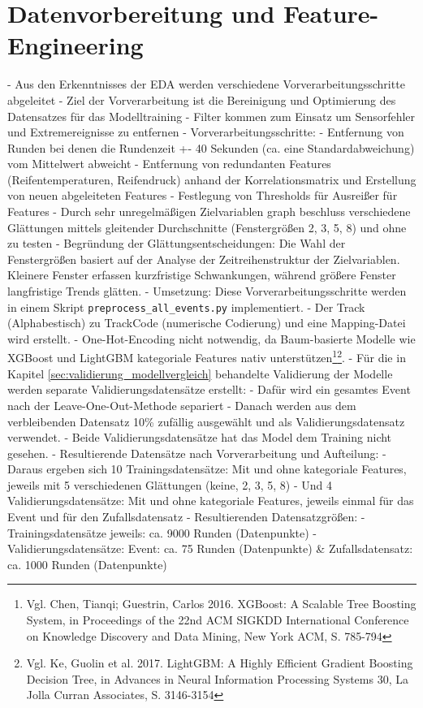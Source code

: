 \section{Datenvorbereitung und Feature-Engineering}

- Aus den Erkenntnisses der EDA werden verschiedene Vorverarbeitungsschritte abgeleitet
- Ziel der Vorverarbeitung ist die Bereinigung und Optimierung des Datensatzes für das Modelltraining
- Filter kommen zum Einsatz um Sensorfehler und Extremereignisse zu entfernen
- Vorverarbeitungsschritte:
- Entfernung von Runden bei denen die Rundenzeit +- 40 Sekunden (ca. eine Standardabweichung) vom Mittelwert abweicht
- Entfernung von redundanten Features (Reifentemperaturen, Reifendruck) anhand der Korrelationsmatrix und Erstellung von neuen abgeleiteten Features
- Festlegung von Thresholds für Ausreißer für Features
- Durch sehr unregelmäßigen Zielvariablen graph beschluss verschiedene Glättungen mittels gleitender Durchschnitte (Fenstergrößen 2, 3, 5, 8) und ohne zu testen
- Begründung der Glättungsentscheidungen: Die Wahl der Fenstergrößen basiert auf der Analyse der Zeitreihenstruktur der Zielvariablen. Kleinere Fenster erfassen kurzfristige Schwankungen, während größere Fenster langfristige Trends glätten.
- Umsetzung: Diese Vorverarbeitungsschritte werden in einem Skript \texttt{preprocess\_all\_events.py} implementiert.
- Der Track (Alphabestisch) zu TrackCode (numerische Codierung) und eine Mapping-Datei wird erstellt.
- One-Hot-Encoding nicht notwendig, da Baum-basierte Modelle wie XGBoost und LightGBM kategoriale Features nativ unterstützen\footnote{Vgl. Chen, Tianqi; Guestrin, Carlos 2016. XGBoost: A Scalable Tree Boosting System, in Proceedings of the 22nd ACM SIGKDD International Conference on Knowledge Discovery and Data Mining, New York ACM, S. 785-794}\footnote{Vgl. Ke, Guolin et al. 2017. LightGBM: A Highly Efficient Gradient Boosting Decision Tree, in Advances in Neural Information Processing Systems 30, La Jolla Curran Associates, S. 3146-3154}.
- Für die in Kapitel \ref{sec:validierung_modellvergleich} behandelte Validierung der Modelle werden separate Validierungsdatensätze erstellt:
- Dafür wird ein gesamtes Event nach der Leave-One-Out-Methode separiert
- Danach werden aus dem verbleibenden Datensatz 10\% zufällig ausgewählt und als Validierungsdatensatz verwendet.
- Beide Validierungsdatensätze hat das Model dem Training nicht gesehen.
- Resultierende Datensätze nach Vorverarbeitung und Aufteilung: 
- Daraus ergeben sich 10 Trainingsdatensätze: Mit und ohne kategoriale Features, jeweils mit 5 verschiedenen Glättungen (keine, 2, 3, 5, 8)
- Und 4 Validierungsdatensätze: Mit und ohne kategoriale Features, jeweils einmal für das Event und für den Zufallsdatensatz
- Resultierenden Datensatzgrößen:
- Trainingsdatensätze jeweils: ca. 9000 Runden (Datenpunkte)
- Validierungsdatensätze: Event: ca. 75 Runden (Datenpunkte) \& Zufallsdatensatz: ca. 1000 Runden (Datenpunkte)

